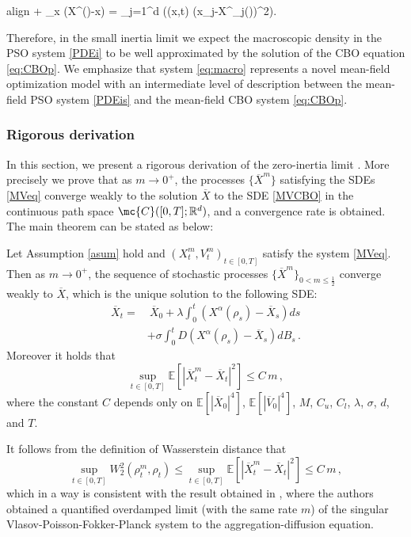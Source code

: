 \documentclass{ims9x6}
\newcommand{\coloredeq}[2]{\begin{empheq}[box={\mymath[colback=gray!13, sharp corners]}]{align}\label{#1}#2\end{empheq}}
\newcommand{\EE}{\mathbb{E}}
\newcommand{\RR}{\mathbb{R}}
\newcommand{\OV}{\overline{V}}
\newcommand{\OX}{\overline{X}}
\begin{document}
\coloredeq{eq:CBOp}{
 + \nabla_x \cdot \lambda (X^{\alpha}(\rho)-x) \rho = \frac{\sigma^2}{2}\sum_{j=1}^d \frac{\partial^2}{\partial x^2_j} \left(\rho(x,t) (x_j-X^\alpha_j(\rho))^2\right).
}
Therefore, in the small inertia limit we expect the macroscopic density in the PSO system \eqref{PDEi} to be well approximated by the solution of the CBO equation \eqref{eq:CBOp}. We emphasize that system \eqref{eq:macro} represents a novel mean-field optimization model with an intermediate level of description between the mean-field PSO system \eqref{PDEis} and the mean-field CBO system \eqref{eq:CBOp}.


\subsubsection{Rigorous derivation}
\label{seczero}
In this section, we present a rigorous derivation of the zero-inertia limit \cite{cipriani2021zero}. More precisely we prove that as $m\to 0^+$, the processes $\{\OX^m\}$ satisfying the SDEs \eqref{MVeq}  converge weakly to the solution  $\OX$ to the SDE \eqref{MVCBO} in the continuous path space $\mc{C}([0,T];\RR^d)$, and a convergence rate is obtained.  The main theorem can be stated as below:
\begin{theo-frmd}\label{thmzero-limit} 
	Let Assumption \ref{asum} hold and $(X_t^m,V_t^m)_{t\in[0,T]}$ satisfy the system \eqref{MVeq}. Then as $m\rightarrow 0^+$, the sequence of  stochastic processes $\{\OX^m\}_{0< m\leq \frac{1}{2}}$  converge weakly to $\overline X$, which is the unique solution to the following SDE:
	\begin{equation}\label{MVCBO1}
	\begin{split}
	\OX_t= &\ \OX_0
	+\lambda\int_0^t(X^{\alpha}(\rho_s)-\OX_s)ds \\
	&+\sigma\int_0^t D(X^{\alpha}(\rho_s)-\OX_s)dB_s\,.
	\end{split}
	\end{equation}
	Moreover it holds that
	\begin{equation}\label{est-convegence-m}
	\sup_{t\in[0,T]}\EE[|\OX^m_t-\OX_t|^2]\leq C \, m\,,
	\end{equation}
	where the constant $C$ depends only on $\EE[|\OX_0|^4]$, $\EE[|\OV_0|^4]$, $M$, $C_u$, $C_l$, $\lambda$, $\sigma$, $d$, and $T$.
\end{theo-frmd}
\begin{remark}
	It follows from the definition of Wasserstein distance that
	\begin{equation}
	\sup_{t\in[0,T]}W_2^2(\rho^m_t,\rho_t)\leq  \sup_{t\in[0,T]}\EE[|\OX^m_t-\OX_t|^2]\leq C\, m \,,
	\end{equation}
	which in a way is consistent with the result obtained in \cite[Theorem 1.3]{choi2020quantified}, where the authors obtained a quantified overdamped limit  (with the same rate $m$) of the singular Vlasov-Poisson-Fokker-Planck system to the aggregation-diffusion equation. 
\end{remark}
\end{document}
